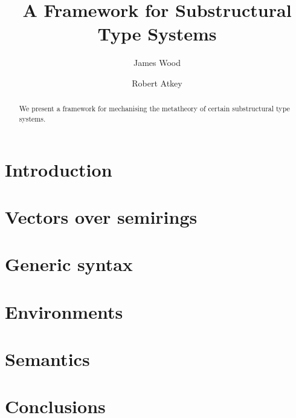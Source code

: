 \documentclass[sigplan,10pt,anonymous,review]{acmart}
\begin{document}
\title{A Framework for Substructural Type Systems}

\author{James Wood}

\author{Robert Atkey}


\begin{abstract}
  We present a framework for mechanising the metatheory of certain substructural
  type systems.
\end{abstract}

\maketitle

\section{Introduction}\label{sec:intro}


\section{Vectors over semirings}\label{sec:algebra}


\section{Generic syntax}\label{sec:syntax}


\section{Environments}\label{sec:env}


\section{Semantics}\label{sec:semantics}


\section{Conclusions}\label{sec:conc}



\end{document}
